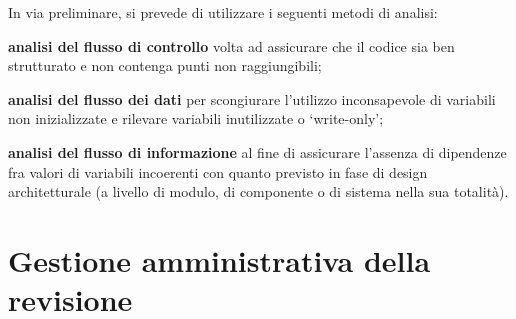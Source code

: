 In via preliminare, si prevede di utilizzare i seguenti metodi di analisi:
\begin{description}
\item{\textbf{analisi del flusso di controllo}} volta ad assicurare che il codice sia ben strutturato e non contenga punti non raggiungibili;
\item{\textbf{analisi del flusso dei dati}} per scongiurare l'utilizzo inconsapevole di variabili non inizializzate e rilevare variabili inutilizzate o `write-only';
\item{\textbf{analisi del flusso di informazione}} al fine di assicurare l'assenza di dipendenze fra valori di variabili incoerenti con quanto previsto in fase di design architetturale (a livello di modulo, di componente o di sistema nella sua totalità).
\end{description}

\clearpage
\section{Gestione amministrativa della revisione}
